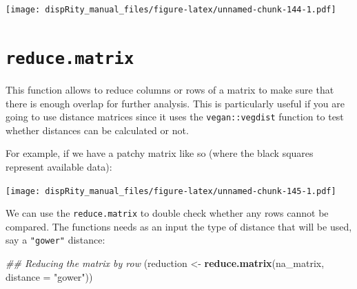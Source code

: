 \documentclass[]{book}
\newenvironment{Shaded}{\begin{snugshade}}{\end{snugshade}}
\newcommand{\CommentTok}[1]{\textcolor[rgb]{0.56,0.35,0.01}{\textit{#1}}}
\newcommand{\DataTypeTok}[1]{\textcolor[rgb]{0.13,0.29,0.53}{#1}}
\newcommand{\DecValTok}[1]{\textcolor[rgb]{0.00,0.00,0.81}{#1}}
\newcommand{\KeywordTok}[1]{\textcolor[rgb]{0.13,0.29,0.53}{\textbf{#1}}}
\newcommand{\NormalTok}[1]{#1}
\newcommand{\OperatorTok}[1]{\textcolor[rgb]{0.81,0.36,0.00}{\textbf{#1}}}
\newcommand{\OtherTok}[1]{\textcolor[rgb]{0.56,0.35,0.01}{#1}}
\newcommand{\StringTok}[1]{\textcolor[rgb]{0.31,0.60,0.02}{#1}}
\begin{document}
\texttt{[image: dispRity\_manual\_files/figure-latex/unnamed-chunk-144-1.pdf]}

\hypertarget{reduce.matrix}{%
\section{\texorpdfstring{\texttt{reduce.matrix}}{reduce.matrix}}\label{reduce.matrix}}

This function allows to reduce columns or rows of a matrix to make sure that there is enough overlap for further analysis.
This is particularly useful if you are going to use distance matrices since it uses the \texttt{vegan::vegdist} function to test whether distances can be calculated or not.

For example, if we have a patchy matrix like so (where the black squares represent available data):

\begin{Shaded}
\end{Shaded}

\texttt{[image: dispRity\_manual\_files/figure-latex/unnamed-chunk-145-1.pdf]}

We can use the \texttt{reduce.matrix} to double check whether any rows cannot be compared.
The functions needs as an input the type of distance that will be used, say a \texttt{"gower"} distance:

\begin{Shaded}
\begin{Highlighting}[]
\CommentTok{## Reducing the matrix by row}
\NormalTok{(reduction <-}\StringTok{ }\KeywordTok{reduce.matrix}\NormalTok{(na_matrix, }\DataTypeTok{distance =} \StringTok{"gower"}\NormalTok{))}
\end{Highlighting}
\end{Shaded}
\end{document}

